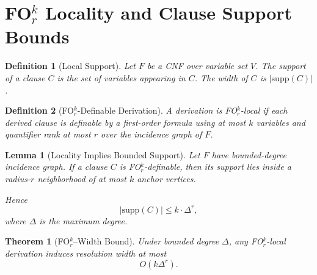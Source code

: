 \documentclass{article}
\newtheorem{definition}{Definition}
\newtheorem{lemma}{Lemma}
\newtheorem{theorem}{Theorem}
\begin{document}
\section{FO$^k_r$ Locality and Clause Support Bounds}

\begin{definition}[Local Support]
Let $F$ be a CNF over variable set $V$.
The support of a clause $C$ is the set of variables appearing in $C$.
The width of $C$ is $| \mathrm{supp}(C) |$.
\end{definition}

\begin{definition}[FO$^k_r$-Definable Derivation]
A derivation is FO$^k_r$-local if each derived clause is definable
by a first-order formula using at most $k$ variables
and quantifier rank at most $r$ over the incidence graph of $F$.
\end{definition}

\begin{lemma}[Locality Implies Bounded Support]
Let $F$ have bounded-degree incidence graph.
If a clause $C$ is FO$^k_r$-definable,
then its support lies inside a radius-$r$ neighborhood
of at most $k$ anchor vertices.

Hence
\[
|\mathrm{supp}(C)| \le k \cdot \Delta^r,
\]
where $\Delta$ is the maximum degree.
\end{lemma}

\begin{theorem}[FO$^k_r$–Width Bound]
Under bounded degree $\Delta$,
any FO$^k_r$-local derivation induces resolution width at most
\[
O(k \Delta^r).
\]
\end{theorem}
\end{document}
